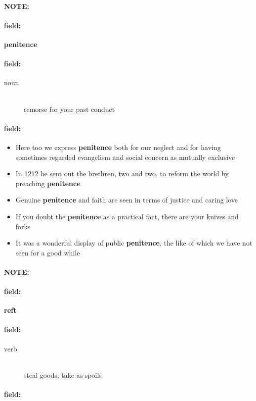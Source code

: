 \documentclass[12pt]{article}
\newenvironment{note}{\paragraph{NOTE:}}{}
\newenvironment{field}{\paragraph{field:}}{}
\begin{document}
\begin{note}
\begin{field}
\textbf{\large penitence}
\end{field}


\begin{field}
\begin{description}
\item[noun] \hfill \\ 
remorse for your past conduct

\end{description}
\end{field}

\begin{field}
\begin{itemize}
\item Here too we express \textbf{penitence} both for our neglect and for having sometimes regarded evangelism and social concern as mutually exclusive
\item In 1212 he sent out the brethren, two and two, to reform the world by preaching \textbf{penitence}
\item Genuine \textbf{penitence} and faith are seen in terms of justice and caring love
\item If you doubt the \textbf{penitence} as a practical fact, there are your knives and forks
\item It was a wonderful display of public \textbf{penitence}, the like of which we have not seen for a good while
\end{itemize}
\end{field}
\end{note}
\begin{note}
\begin{field}
\textbf{\large reft}
\end{field}


\begin{field}
\begin{description}
\item[verb] \hfill \\ 
steal goods; take as spoils

\end{description}
\end{field}

\begin{field}
\end{field}
\end{note}
\end{document}
